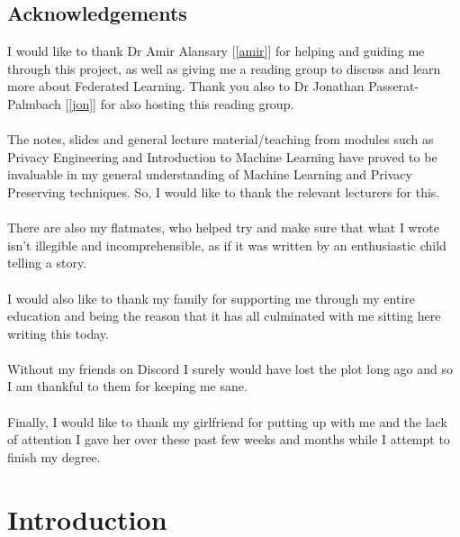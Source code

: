 \documentclass[12pt,twoside]{report}
\begin{document}
\section*{Acknowledgements}
I would like to thank Dr Amir Alansary [\ref{amir}] for helping and guiding me through this project, as well as giving me a reading group to discuss and learn more about Federated Learning. 
Thank you also to Dr Jonathan Passerat-Palmbach [\ref{jon}] for also hosting this reading group.
\\ \\
The notes, slides and general lecture material/teaching from modules such as Privacy Engineering and Introduction to Machine Learning have proved to be invaluable in my general understanding of Machine Learning and Privacy Preserving techniques. So, I would like to thank the relevant lecturers for this.
\\ \\
There are also my flatmates, who helped try and make sure that what I wrote isn't illegible and incomprehensible, as if it was written by an enthusiastic child telling a story.
\\ \\
I would also like to thank my family for supporting me through my entire education and being the reason that it has all culminated with me sitting here writing this today.
\\ \\
Without my friends on Discord I surely would have lost the plot long ago and so I am thankful to them for keeping me sane.
\\ \\
Finally, I would like to thank my girlfriend for putting up with me and the lack of attention I gave her over these past few weeks and months while I attempt to finish my degree.

\clearpage{\pagestyle{empty}}

\tableofcontents 


\clearpage{\pagestyle{empty}}
\setcounter{page}{1}
\fancyhead[LE,RO]{\slshape \rightmark}
\fancyhead[LO,RE]{\slshape \leftmark}

\chapter{Introduction}

\end{document}

